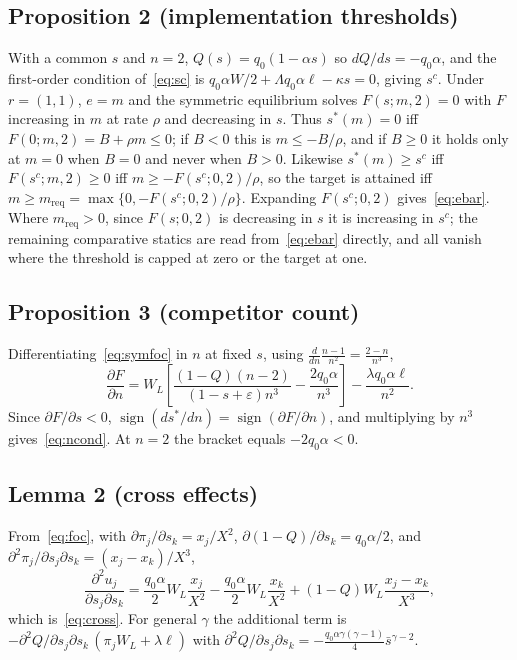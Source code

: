 \documentclass[11pt]{article}
\theoremstyle{plain}
\theoremstyle{definition}
\theoremstyle{remark}
\newcommand{\Lam}{\Lambda}
\newcommand{\WL}{W_{\!L}}
\newcommand{\Sh}{\bar s}
\begin{document}
\subsection{Proposition 2 (implementation thresholds)}
With a common $s$ and $n=2$, $Q(s)=q_0(1-\alpha s)$ so $dQ/ds=-q_0\alpha$, and the first-order condition of~\eqref{eq:sc} is $q_0\alpha W/2+\Lam q_0\alpha\ell-\kappa s=0$, giving $s^c$. Under $r=(1,1)$, $e=m$ and the symmetric equilibrium solves $F(s;m,2)=0$ with $F$ increasing in $m$ at rate $\rho$ and decreasing in $s$. Thus $s^*(m)=0$ iff $F(0;m,2)=B+\rho m\le0$; if $B<0$ this is $m\le-B/\rho$, and if $B\ge0$ it holds only at $m=0$ when $B=0$ and never when $B>0$. Likewise $s^*(m)\ge s^c$ iff $F(s^c;m,2)\ge0$ iff $m\ge-F(s^c;0,2)/\rho$, so the target is attained iff $m\ge m_{\mathrm{req}}=\max\{0,-F(s^c;0,2)/\rho\}$. Expanding $F(s^c;0,2)$ gives~\eqref{eq:ebar}. Where $m_{\mathrm{req}}>0$, since $F(s;0,2)$ is decreasing in $s$ it is increasing in $s^c$; the remaining comparative statics are read from~\eqref{eq:ebar} directly, and all vanish where the threshold is capped at zero or the target at one.

\subsection{Proposition 3 (competitor count)}
Differentiating~\eqref{eq:symfoc} in $n$ at fixed $s$, using $\tfrac{d}{dn}\tfrac{n-1}{n^2}=\tfrac{2-n}{n^3}$,
\[
\frac{\partial F}{\partial n}=\WL\left[\frac{(1-Q)(n-2)}{(1-s+\varepsilon)n^3}-\frac{2q_0\alpha}{n^3}\right]-\frac{\lambda q_0\alpha\ell}{n^2}.
\]
Since $\partial F/\partial s<0$, $\operatorname{sign}(ds^*/dn)=\operatorname{sign}(\partial F/\partial n)$, and multiplying by $n^3$ gives~\eqref{eq:ncond}. At $n=2$ the bracket equals $-2q_0\alpha<0$.

\subsection{Lemma 2 (cross effects)}
From~\eqref{eq:foc}, with $\partial\pi_j/\partial s_k=x_j/X^2$, $\partial(1-Q)/\partial s_k=q_0\alpha/2$, and $\partial^2\pi_j/\partial s_j\partial s_k=(x_j-x_k)/X^3$,
\[
\frac{\partial^2u_j}{\partial s_j\partial s_k}=\frac{q_0\alpha}{2}\WL\frac{x_j}{X^2}-\frac{q_0\alpha}{2}\WL\frac{x_k}{X^2}+(1-Q)\WL\frac{x_j-x_k}{X^3},
\]
which is~\eqref{eq:cross}. For general $\gamma$ the additional term is $-\partial^2Q/\partial s_j\partial s_k\,(\pi_j\WL+\lambda\ell)$ with $\partial^2Q/\partial s_j\partial s_k=-\tfrac{q_0\alpha\gamma(\gamma-1)}{4}\Sh^{\gamma-2}$.
\end{document}
